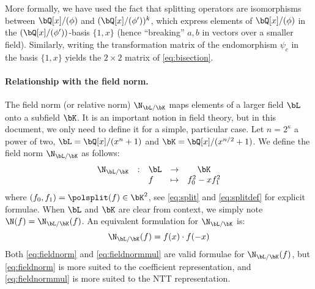  More formally, we have used the fact that splitting operators are isomorphisms between $\bQ[x]/(\phi)$ and $(\bQ[x]/(\phi'))^k$, which express elements of $\bQ[x]/(\phi)$ in the $(\bQ[x]/(\phi'))$-basis $\{1,x\}$ (hence ``breaking'' $a,b$ in vectors over a smaller field). Similarly, writing the transformation matrix of the endomorphism $\psi_c$ in the basis $\{1,x\}$ yields the $2\times 2$ matrix of \eqref{eq:bisection}.

%


\paragraph{Relationship with the field norm.} The field norm (or relative norm) $\N_{\bL/\bK}$ maps elements of a larger field $\bL$ onto a subfield $\bK$. It is an important notion in field theory, but in this document, we only need to define it for a simple, particular case. Let $n = 2^\kappa$ a power of two, $\bL = \bQ[x]/(x^{n} + 1)$ and $\bK = \bQ[x]/(x^{n/2} + 1)$. We define the field norm $\N_{\bL/\bK}$ as follows:
\begin{equation}\label{eq:fieldnorm}
\begin{array}{llllc}
\N_{\bL/\bK} & : & \bL & \rightarrow & \bK \\
& & f & \mapsto & f_0^2 - x f_1^2
\end{array}
\end{equation}
where $(f_0,f_1) = \polsplit(f) \in \bK^2$, see \eqref{eq:split} and \eqref{eq:splitdef} for explicit formulae. When $\bL$ and $\bK$ are clear from context, we simply note $\N(f) = \N_{\bL/\bK}(f)$. An equivalent formulation for $\N_{\bL/\bK}$ is:
\begin{equation}\label{eq:fieldnormmul}
\N_{\bL/\bK} (f) = f(x) \cdot f(-x)
\end{equation}
Both \eqref{eq:fieldnorm} and \eqref{eq:fieldnormmul} are valid formulae for $\N_{\bL/\bK}(f)$, but \eqref{eq:fieldnorm} is more suited to the coefficient representation, and \eqref{eq:fieldnormmul} is more suited to the NTT representation.
